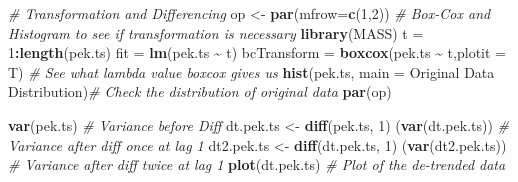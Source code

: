 \documentclass[
]{article}
\newenvironment{Shaded}{\begin{snugshade}}{\end{snugshade}}
\newcommand{\AttributeTok}[1]{\textcolor[rgb]{0.13,0.29,0.53}{#1}}
\newcommand{\CommentTok}[1]{\textcolor[rgb]{0.56,0.35,0.01}{\textit{#1}}}
\newcommand{\DecValTok}[1]{\textcolor[rgb]{0.00,0.00,0.81}{#1}}
\newcommand{\FunctionTok}[1]{\textcolor[rgb]{0.13,0.29,0.53}{\textbf{#1}}}
\newcommand{\NormalTok}[1]{#1}
\newcommand{\OtherTok}[1]{\textcolor[rgb]{0.56,0.35,0.01}{#1}}
\newcommand{\SpecialCharTok}[1]{\textcolor[rgb]{0.81,0.36,0.00}{\textbf{#1}}}
\newcommand{\StringTok}[1]{\textcolor[rgb]{0.31,0.60,0.02}{#1}}
\begin{document}
\begin{Shaded}
\begin{Highlighting}[]
\CommentTok{\# Transformation and Differencing}
\NormalTok{op }\OtherTok{\textless{}{-}} \FunctionTok{par}\NormalTok{(}\AttributeTok{mfrow=}\FunctionTok{c}\NormalTok{(}\DecValTok{1}\NormalTok{,}\DecValTok{2}\NormalTok{)) }\CommentTok{\# Box{-}Cox and Histogram to see if transformation is necessary}
\FunctionTok{library}\NormalTok{(MASS)}
\NormalTok{t }\OtherTok{=} \DecValTok{1}\SpecialCharTok{:}\FunctionTok{length}\NormalTok{(pek.ts)}
\NormalTok{fit }\OtherTok{=} \FunctionTok{lm}\NormalTok{(pek.ts }\SpecialCharTok{\textasciitilde{}}\NormalTok{ t)}
\NormalTok{bcTransform }\OtherTok{=} \FunctionTok{boxcox}\NormalTok{(pek.ts }\SpecialCharTok{\textasciitilde{}}\NormalTok{ t,}\AttributeTok{plotit =}\NormalTok{ T) }\CommentTok{\# See what lambda value boxcox gives us}
\FunctionTok{hist}\NormalTok{(pek.ts, }\AttributeTok{main =} \StringTok{\textquotesingle{}Original Data Distribution\textquotesingle{}}\NormalTok{)}\CommentTok{\# Check the distribution of original data}
\FunctionTok{par}\NormalTok{(op)}

\FunctionTok{var}\NormalTok{(pek.ts) }\CommentTok{\# Variance before Diff}
\NormalTok{dt.pek.ts }\OtherTok{\textless{}{-}} \FunctionTok{diff}\NormalTok{(pek.ts, }\DecValTok{1}\NormalTok{)}
\NormalTok{(}\FunctionTok{var}\NormalTok{(dt.pek.ts)) }\CommentTok{\# Variance after diff once at lag 1}
\NormalTok{dt2.pek.ts }\OtherTok{\textless{}{-}} \FunctionTok{diff}\NormalTok{(dt.pek.ts, }\DecValTok{1}\NormalTok{)}
\NormalTok{(}\FunctionTok{var}\NormalTok{(dt2.pek.ts)) }\CommentTok{\# Variance after diff twice at lag 1}
\FunctionTok{plot}\NormalTok{(dt.pek.ts) }\CommentTok{\# Plot of the de{-}trended data}


\end{Highlighting}
\end{Shaded}
\end{document}

